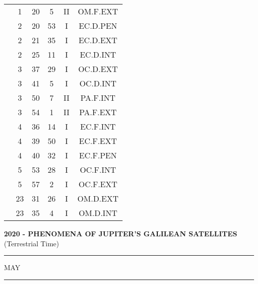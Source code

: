 \documentclass[12pt, a4paper]{article}
\begin{document}
\begin{multicols}{3}
{\begin{tabular}{c c c c c c}
	 	 	 	 & 1 & 20 & 5 & II & OM.F.EXT\\%
	 	 	 	 & 2 & 20 & 53 & I & EC.D.PEN\\%
	 	 	 	 & 2 & 21 & 35 & I & EC.D.EXT\\%
	 	 	 	 & 2 & 25 & 11 & I & EC.D.INT\\%
	 	 	 	 & 3 & 37 & 29 & I & OC.D.EXT\\%
	 	 	 	 & 3 & 41 & 5 & I & OC.D.INT\\%
	 	 	 	 & 3 & 50 & 7 & II & PA.F.INT\\%
	 	 	 	 & 3 & 54 & 1 & II & PA.F.EXT\\%
	 	 	 	 & 4 & 36 & 14 & I & EC.F.INT\\%
	 	 	 	 & 4 & 39 & 50 & I & EC.F.EXT\\%
	 	 	 	 & 4 & 40 & 32 & I & EC.F.PEN\\%
	 	 	 	 & 5 & 53 & 28 & I & OC.F.INT\\%
	 	 	 	 & 5 & 57 & 2 & I & OC.F.EXT\\%
	 	 	 	 & 23 & 31 & 26 & I & OM.D.EXT\\%
	 	 	 	 & 23 & 35 & 4 & I & OM.D.INT\\%
	 	 \end{tabular}
 	}
\end{multicols}
\textbf{2020 - PHENOMENA OF JUPITER'S GALILEAN SATELLITES}\\(Terrestrial Time) 
\vspace{0.1cm} \hrule \vspace{0.1cm}
MAY\vspace{0.1cm}
\hrule
\vspace{-0.2cm}
\end{document}
